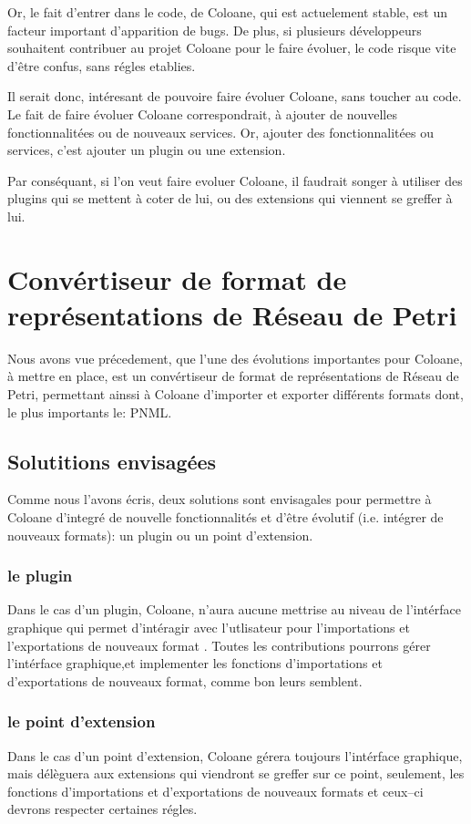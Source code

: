 \documentclass{article}
\begin{document}
Or, le fait d'entrer dans le code, de Coloane, qui est actuelement stable, est 
un facteur important d'apparition de bugs. De plus, si plusieurs développeurs 
souhaitent contribuer au projet Coloane pour le faire évoluer, le code risque 
vite d'être confus, sans régles etablies.

Il serait donc, intéresant de pouvoire faire évoluer Coloane, sans toucher 
au code. Le fait de faire évoluer Coloane correspondrait, à ajouter de 
nouvelles fonctionnalitées ou de nouveaux services. Or, ajouter des 
fonctionnalitées ou services, c'est ajouter un plugin ou une extension.

Par conséquant, si l'on veut faire evoluer Coloane, il faudrait 
songer à utiliser des plugins qui se mettent à coter de lui, ou des extensions 
qui viennent se greffer à lui.

\newpage

\section{Convértiseur de format de représentations de Réseau de Petri}
Nous avons vue précedement, que l'une des évolutions importantes pour 
Coloane, à mettre en place, est un convértiseur de format de représentations de 
Réseau de Petri, permettant ainssi à Coloane d'importer et exporter différents 
formats dont, le plus importants le: PNML.

\subsection{Solutitions envisagées}
Comme nous l'avons écris, deux solutions sont envisagales pour permettre à 
Coloane d'integré de nouvelle fonctionnalités et d'être évolutif (i.e. intégrer 
de nouveaux formats): un plugin ou un point d'extension.

\subsubsection{le plugin}
Dans le cas d'un plugin, Coloane, n'aura aucune mettrise au niveau de 
l'intérface graphique qui permet d'intéragir avec l'utlisateur pour 
l'importations et l'exportations de nouveaux format . Toutes les contributions 
pourrons gérer l'intérface graphique,et implementer les fonctions d'importations 
et d'exportations de nouveaux format, comme bon leurs semblent.

\subsubsection{le point d'extension}
Dans le cas d'un point d'extension, Coloane gérera toujours l'intérface 
graphique, mais délèguera aux extensions qui viendront se greffer sur ce point, 
seulement, les fonctions d'importations et d'exportations de nouveaux formats et 
ceux--ci devrons respecter certaines régles.
\end{document}

